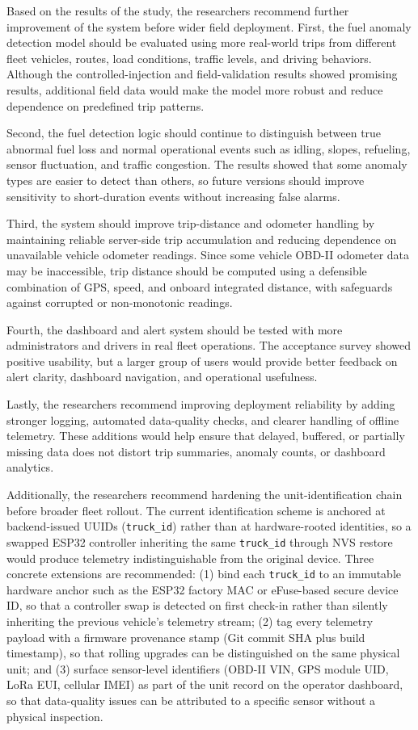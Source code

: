 Based on the results of the study, the researchers recommend further improvement of the system before wider field deployment. First, the fuel anomaly detection model should be evaluated using more real-world trips from different fleet vehicles, routes, load conditions, traffic levels, and driving behaviors. Although the controlled-injection and field-validation results showed promising results, additional field data would make the model more robust and reduce dependence on predefined trip patterns.

Second, the fuel detection logic should continue to distinguish between true abnormal fuel loss and normal operational events such as idling, slopes, refueling, sensor fluctuation, and traffic congestion. The results showed that some anomaly types are easier to detect than others, so future versions should improve sensitivity to short-duration events without increasing false alarms.

Third, the system should improve trip-distance and odometer handling by maintaining reliable server-side trip accumulation and reducing dependence on unavailable vehicle odometer readings. Since some vehicle OBD-II odometer data may be inaccessible, trip distance should be computed using a defensible combination of GPS, speed, and onboard integrated distance, with safeguards against corrupted or non-monotonic readings.

Fourth, the dashboard and alert system should be tested with more administrators and drivers in real fleet operations. The acceptance survey showed positive usability, but a larger group of users would provide better feedback on alert clarity, dashboard navigation, and operational usefulness.

Lastly, the researchers recommend improving deployment reliability by adding stronger logging, automated data-quality checks, and clearer handling of offline telemetry. These additions would help ensure that delayed, buffered, or partially missing data does not distort trip summaries, anomaly counts, or dashboard analytics.

Additionally, the researchers recommend hardening the unit-identification chain before broader fleet rollout. The current identification scheme is anchored at backend-issued UUIDs (\texttt{truck\_id}) rather than at hardware-rooted identities, so a swapped ESP32 controller inheriting the same \texttt{truck\_id} through NVS restore would produce telemetry indistinguishable from the original device. Three concrete extensions are recommended: (1) bind each \texttt{truck\_id} to an immutable hardware anchor such as the ESP32 factory MAC or eFuse-based secure device ID, so that a controller swap is detected on first check-in rather than silently inheriting the previous vehicle's telemetry stream; (2) tag every telemetry payload with a firmware provenance stamp (Git commit SHA plus build timestamp), so that rolling upgrades can be distinguished on the same physical unit; and (3) surface sensor-level identifiers (OBD-II VIN, GPS module UID, LoRa EUI, cellular IMEI) as part of the unit record on the operator dashboard, so that data-quality issues can be attributed to a specific sensor without a physical inspection.

